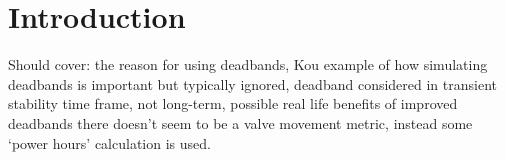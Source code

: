\section{Introduction}
Should cover:
the reason for using deadbands, 
Kou example of how simulating deadbands is important but typically ignored,
deadband considered in transient stability time frame, not long-term,
possible real life benefits of improved deadbands
there doesn't seem to be a valve movement metric, instead some `power hours' calculation is used.

